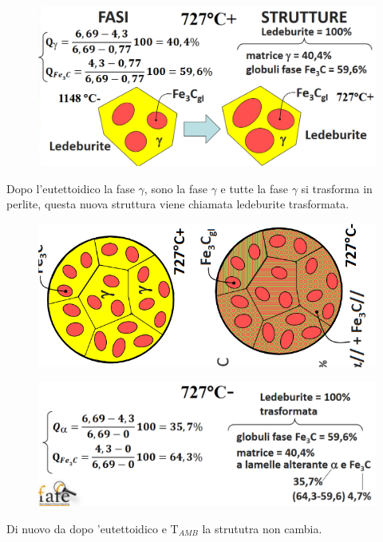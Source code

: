 \documentclass{article}
\begin{document}
{            \begin{figure}[h!]
                \centering
                \includegraphics[width=.7\linewidth]{L14 - C = 4,3 Calcolo 727+.png}
            \end{figure}
            \newpage
            Dopo l'eutettoidico la fase $\gamma$, sono la fase $\gamma$ e tutte la fase $\gamma$ si trasforma in perlite, questa nuova struttura viene chiamata ledeburite trasformata.\\
            \begin{figure}[h!]
                \centering
                \includegraphics[width=.7\linewidth]{L14 - C = 4,3 Strutture 727+ a 727-.png}
            \end{figure}
            \begin{figure}[h!]
                \centering
                \includegraphics[width=.7\linewidth]{L14 - C = 4,3 Calcolo 727-.png}
            \end{figure}
            Di nuovo da dopo 'eutettoidico e T$_{AMB}$ la strututra non cambia.\\

}
\end{document}
